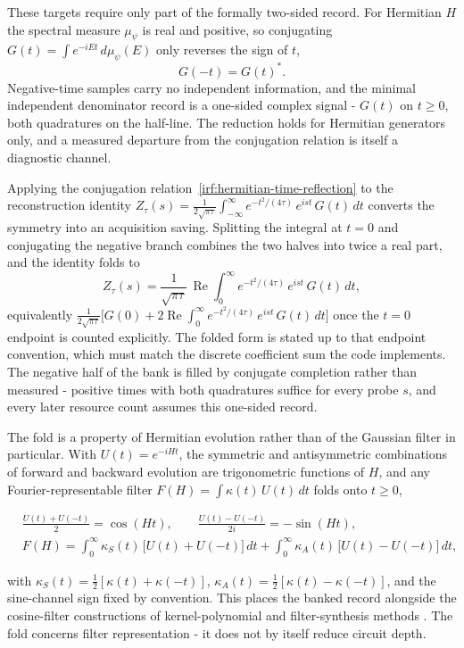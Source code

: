 These targets require only part of the formally two-sided record. For Hermitian $H$ the spectral measure $\mu_\psi$ is real and positive, so conjugating $G(t) = \int e^{-iEt}\,d\mu_\psi(E)$ only reverses the sign of $t$,
\begin{equation}\label{irf:hermitian-time-reflection}
G(-t) = G(t)^* .
\end{equation}
Negative-time samples carry no independent information, and the minimal independent denominator record is a one-sided complex signal - $G(t)$ on $t \ge 0$, both quadratures on the half-line. The reduction holds for Hermitian generators only, and a measured departure from the conjugation relation is itself a diagnostic channel.

Applying the conjugation relation~\eqref{irf:hermitian-time-reflection} to the reconstruction identity $Z_\tau(s) = \frac{1}{2\sqrt{\pi\tau}}\int_{-\infty}^{\infty} e^{-t^2/(4\tau)}\,e^{ist}\,G(t)\,dt$ converts the symmetry into an acquisition saving. Splitting the integral at $t = 0$ and conjugating the negative branch combines the two halves into twice a real part, and the identity folds to
\begin{equation}\label{res:one-sided-reconstruction}
Z_\tau(s) = \frac{1}{\sqrt{\pi\tau}}\,\operatorname{Re}\int_0^{\infty} e^{-t^2/(4\tau)}\,e^{ist}\,G(t)\,dt ,
\end{equation}
equivalently $\frac{1}{2\sqrt{\pi\tau}}\big[G(0) + 2\operatorname{Re}\int_0^{\infty} e^{-t^2/(4\tau)}\,e^{ist}\,G(t)\,dt\big]$ once the $t = 0$ endpoint is counted explicitly. The folded form is stated up to that endpoint convention, which must match the discrete coefficient sum the code implements. The negative half of the bank is filled by conjugate completion rather than measured - positive times with both quadratures suffice for every probe $s$, and every later resource count assumes this one-sided record.

The fold is a property of Hermitian evolution rather than of the Gaussian filter in particular. With $U(t) = e^{-iHt}$, the symmetric and antisymmetric combinations of forward and backward evolution are trigonometric functions of $H$, and any Fourier-representable filter $F(H) = \int \kappa(t)\,U(t)\,dt$ folds onto $t \ge 0$,
\begin{widetext}
\begin{equation}\label{res:cosine-sine-filter-folding}
\begin{aligned}
&\frac{U(t)+U(-t)}{2} = \cos(Ht), \qquad \frac{U(t)-U(-t)}{2i} = -\sin(Ht),\\
&F(H) = \int_0^{\infty}\kappa_S(t)\,\big[U(t)+U(-t)\big]\,dt + \int_0^{\infty}\kappa_A(t)\,\big[U(t)-U(-t)\big]\,dt ,
\end{aligned}
\end{equation}
\end{widetext}
with $\kappa_S(t) = \frac{1}{2}[\kappa(t)+\kappa(-t)]$, $\kappa_A(t) = \frac{1}{2}[\kappa(t)-\kappa(-t)]$, and the sine-channel sign fixed by convention. This places the banked record alongside the cosine-filter constructions of kernel-polynomial and filter-synthesis methods \cite{weisse2006kpm, ge2019filter, dong2022qetu}. The fold concerns filter representation - it does not by itself reduce circuit depth.

